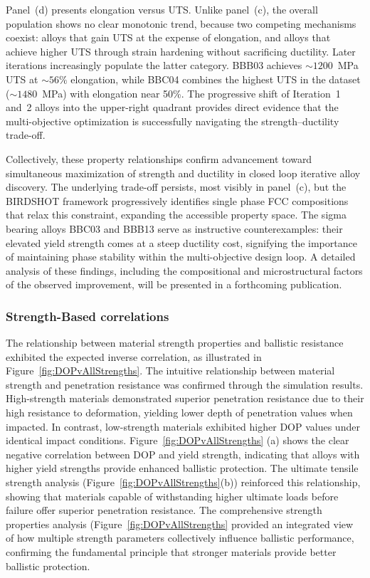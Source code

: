 Panel~(d) presents elongation versus UTS. Unlike panel~(c), the overall population shows no clear monotonic trend, because two competing mechanisms coexist: alloys that gain UTS at the expense of elongation, and alloys that achieve higher UTS through strain hardening without sacrificing ductility. Later iterations increasingly populate the latter category. BBB03 achieves ${\sim}1200$~MPa UTS at ${\sim}56\%$ elongation, while BBC04 combines the highest UTS in the dataset (${\sim}1480$~MPa) with elongation near 50\%. The progressive shift of Iteration~1 and~2 alloys into the upper-right quadrant provides direct evidence that the multi-objective optimization is successfully navigating the strength--ductility trade-off.

Collectively, these property relationships confirm advancement toward simultaneous maximization of strength and ductility in closed loop iterative alloy discovery. The underlying trade-off persists, most visibly in panel~(c), but the BIRDSHOT framework progressively identifies single phase FCC compositions that relax this constraint, expanding the accessible property space. The sigma bearing
alloys BBC03 and BBB13 serve as instructive counterexamples: their elevated yield strength comes at a steep ductility cost, signifying the importance of maintaining phase stability within the multi-objective design loop. A detailed analysis of these findings, including the compositional and microstructural factors of the observed improvement, will be presented in a forthcoming publication.                  


\subsubsection{Strength-Based correlations}

The relationship between material strength properties and ballistic resistance exhibited the expected inverse correlation, as illustrated in Figure~\ref{fig:DOPvAllStrengths}. The intuitive relationship between material strength and penetration resistance was confirmed through the simulation results. High-strength materials demonstrated superior penetration resistance due to their high resistance to deformation, yielding lower depth of penetration values when impacted. In contrast, low-strength materials exhibited higher DOP values under identical impact conditions.
Figure~\ref{fig:DOPvAllStrengths} (a) shows the clear negative correlation between DOP and yield strength, indicating that alloys with higher yield strengths provide enhanced ballistic protection. The ultimate tensile strength analysis (Figure~\ref{fig:DOPvAllStrengths}(b)) reinforced this relationship, showing that materials capable of withstanding higher ultimate loads before failure offer superior penetration resistance. The comprehensive strength properties analysis (Figure~\ref{fig:DOPvAllStrengths} provided an integrated view of how multiple strength parameters collectively influence ballistic performance, confirming the fundamental principle that stronger materials provide better ballistic protection.


